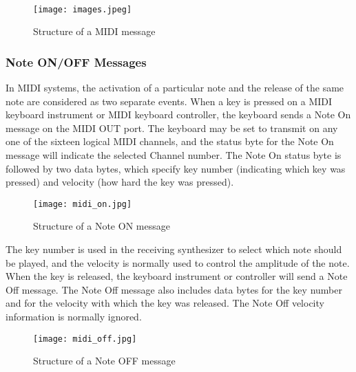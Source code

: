 \documentclass[12pt,a4paper]{article}
\begin{document}
\paragraph{}



\begin{figure}[h]
\centering
\texttt{[image: images.jpeg]}
\caption{Structure of a MIDI message}
\label{midi_message}
\end{figure}




\subsubsection{Note ON/OFF Messages}
In MIDI systems, the activation of a particular note and the release of the same note are considered as two separate events. When a key is pressed on a MIDI keyboard instrument or MIDI keyboard controller, the keyboard sends a Note On message on the MIDI OUT port. The keyboard may be set to transmit on any one of the sixteen logical MIDI channels, and the status byte for the Note On message will indicate the selected Channel number. The Note On status byte is followed by two data bytes, which specify key number (indicating which key was pressed) and velocity (how hard the key was pressed).

\begin{figure}[!htb]
\centering
\texttt{[image: midi\_on.jpg]}
\caption{Structure of a Note ON message}
\label{ON}
\end{figure}
The key number is used in the receiving synthesizer to select which note should be played, and the velocity is normally used to control the amplitude of the note. When the key is released, the keyboard instrument or controller will send a Note Off message. The Note Off message also includes data bytes for the key number and for the velocity with which the key was released. The Note Off velocity information is normally ignored.

\begin{figure}[!htb]
\centering
\texttt{[image: midi\_off.jpg]}
\caption{Structure of a Note OFF message}
\label{OFF}
\end{figure}
\end{document}
